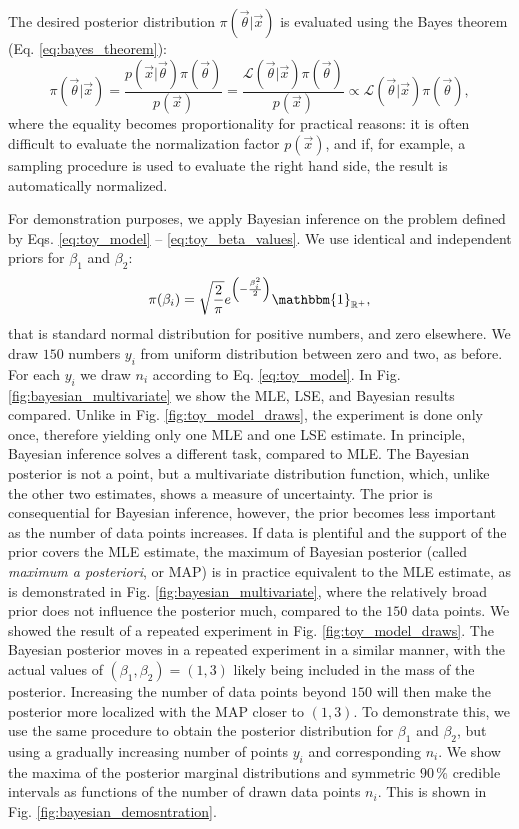 The desired posterior distribution $\pi(\vec{\theta}|\vec{x})$ is evaluated using the Bayes theorem (Eq. \ref{eq:bayes_theorem}):
\begin{equation}
    \pi(\vec{\theta}|\vec{x}) = \frac{p(\vec{x}|\vec{\theta}) \pi(\vec{\theta})}{p(\vec{x})} = \frac{\mathcal{L}(\vec{\theta}|\vec{x}) \pi(\vec{\theta})}{p(\vec{x})} \propto \mathcal{L}(\vec{\theta}|\vec{x}) \pi(\vec{\theta}),
    \label{eq:bayesian_inference}
\end{equation}
where the equality becomes proportionality for practical reasons: it is often difficult to evaluate the normalization factor $p(\vec{x})$, and if, for example, a sampling procedure is used to evaluate the right hand side, the result is automatically normalized. 

For demonstration purposes, we apply Bayesian inference on the problem defined by Eqs. \ref{eq:toy_model} -- \ref{eq:toy_beta_values}. We use identical and independent priors for $\beta_1$ and $\beta_2$:
\begin{equation}
    \pi(\beta_i) = \sqrt{\frac{2}{\pi}} e^{\left(-\frac{\beta_i^2}{2}\right)} \mathbbm{1}_{\mathbb{R}^+} ,
\end{equation}
that is standard normal distribution for positive numbers, and zero elsewhere. We draw $150$ numbers $y_i$ from uniform distribution between zero and two, as before. For each $y_i$ we draw $n_i$ according to Eq. \ref{eq:toy_model}. In Fig. \ref{fig:bayesian_multivariate} we show the MLE, LSE, and Bayesian results compared. Unlike in Fig. \ref{fig:toy_model_draws}, the experiment is done only once, therefore yielding only one MLE and one LSE estimate. In principle, Bayesian inference solves a different task, compared to MLE. The Bayesian posterior is not a point, but a multivariate distribution function, which, unlike the other two estimates, shows a measure of uncertainty. The prior is consequential for Bayesian inference, however, the prior becomes less important as the number of data points increases. If data is plentiful and the support of the prior covers the MLE estimate, the maximum of Bayesian posterior (called \textit{maximum a posteriori}, or MAP) is in practice equivalent to the MLE estimate, as is demonstrated in Fig. \ref{fig:bayesian_multivariate}, where the relatively broad prior does not influence the posterior much, compared to the $150$ data points. We showed the result of a repeated experiment in Fig. \ref{fig:toy_model_draws}. The Bayesian posterior moves in a repeated experiment in a similar manner, with the actual values of $(\beta_1,\beta_2) = (1,3)$ likely being included in the mass of the posterior. Increasing the number of data points beyond $150$ will then make the posterior more localized with the MAP closer to $(1,3)$. To demonstrate this, we use the same procedure to obtain the posterior distribution for $\beta_1$ and $\beta_2$, but using a gradually increasing number of points $y_i$ and corresponding $n_i$. We show the maxima of the posterior marginal distributions and symmetric $90 \, \%$ credible intervals as functions of the number of drawn data points $n_i$. This is shown in Fig. \ref{fig:bayesian_demosntration}.

